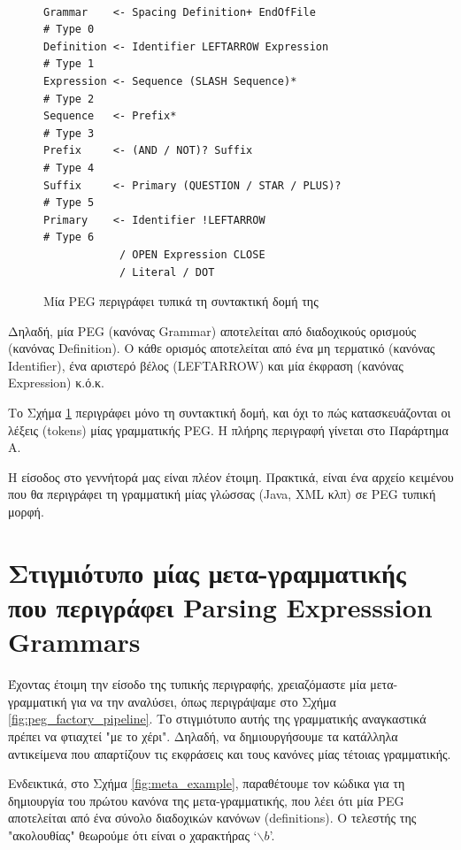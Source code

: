 \documentclass[diploma]{softlab-thesis}
\begin{document}
\begin{figure}[h]
\begin{Verbatim}

Grammar    <- Spacing Definition+ EndOfFile                     # Type 0
Definition <- Identifier LEFTARROW Expression                   # Type 1
Expression <- Sequence (SLASH Sequence)*                        # Type 2
Sequence   <- Prefix*                                           # Type 3
Prefix     <- (AND / NOT)? Suffix                               # Type 4
Suffix     <- Primary (QUESTION / STAR / PLUS)?                 # Type 5
Primary    <- Identifier !LEFTARROW                             # Type 6
            / OPEN Expression CLOSE
            / Literal / DOT
\end{Verbatim}
\label{fig:peg_specification}
\caption{Μία PEG περιγράφει τυπικά τη συντακτική δομή της}
\end{figure}

Δηλαδή, μία PEG (κανόνας Grammar) αποτελείται από διαδοχικούς ορισμούς (κανόνας Definition). 
Ο κάθε ορισμός αποτελείται από ένα μη τερματικό (κανόνας Identifier), ένα αριστερό βέλος (LEFTARROW) και μία έκφραση (κανόνας Expression) κ.ό.κ.

Το Σχήμα \ref{fig:peg_specification} περιγράφει μόνο τη συντακτική δομή, και όχι το πώς κατασκευάζονται οι λέξεις (tokens) μίας γραμματικής PEG.
H πλήρης περιγραφή γίνεται στο Παράρτημα Α.

Η είσοδος στο γεννήτορά μας είναι πλέον έτοιμη. 
Πρακτικά, είναι ένα αρχείο κειμένου που θα περιγράφει τη γραμματική μίας γλώσσας (Java, XML κλπ) σε PEG τυπική μορφή.

\section{Στιγμιότυπο μίας μετα-γραμματικής που περιγράφει Parsing Expresssion Grammars}

Έχοντας έτοιμη την είσοδο της τυπικής περιγραφής, χρειαζόμαστε μία μετα-γραμματική για να την αναλύσει, όπως περιγράψαμε στο Σχήμα \ref{fig:peg_factory_pipeline}. 
Το στιγμιότυπο αυτής της γραμματικής αναγκαστικά πρέπει να φτιαχτεί "με το χέρι".
Δηλαδή, να δημιουργήσουμε τα κατάλληλα αντικείμενα που απαρτίζουν τις εκφράσεις και τους κανόνες μίας τέτοιας γραμματικής.

Ενδεικτικά, στο Σχήμα \ref{fig:meta_example}, παραθέτουμε τον κώδικα για τη δημιουργία του πρώτου κανόνα της μετα-γραμματικής, που λέει ότι μία PEG αποτελείται από ένα σύνολο διαδοχικών κανόνων (definitions). O τελεστής της "ακολουθίας" θεωρούμε ότι είναι ο χαρακτήρας `$\backslash b$'. 
\end{document}

